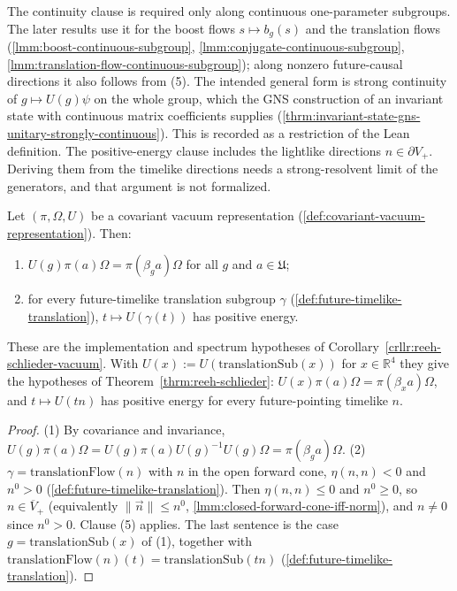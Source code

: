 \begin{definition}
    The continuity clause is required only along continuous one-parameter subgroups. The later results use it for the boost flows $s \mapsto b_g(s)$ and the translation flows (\ref{lmm:boost-continuous-subgroup}, \ref{lmm:conjugate-continuous-subgroup}, \ref{lmm:translation-flow-continuous-subgroup}); along nonzero future-causal directions it also follows from (5). The intended general form is strong continuity of $g \mapsto U(g)\psi$ on the whole group, which the GNS construction of an invariant state with continuous matrix coefficients supplies (\ref{thrm:invariant-state-gns-unitary-strongly-continuous}). This is recorded as a restriction of the Lean definition. The positive-energy clause includes the lightlike directions $n \in \partial V_+$. Deriving them from the timelike directions needs a strong-resolvent limit of the generators, and that argument is not formalized.
\end{definition}

\begin{lemma}
    \label{lmm:covariant-vacuum-bridge}
    \leanok
    Let $(\pi, \Omega, U)$ be a covariant vacuum representation (\ref{def:covariant-vacuum-representation}). Then:
    \begin{enumerate}
        \item $U(g)\pi(a)\Omega = \pi(\beta_g a)\Omega$ for all $g$ and $a \in \mathfrak{U}$;
        \item for every future-timelike translation subgroup $\gamma$ (\ref{def:future-timelike-translation}), $t \mapsto U(\gamma(t))$ has positive energy.
    \end{enumerate}
    These are the implementation and spectrum hypotheses of Corollary~\ref{crllr:reeh-schlieder-vacuum}. With $U(x) := U(\mathrm{translationSub}(x))$ for $x \in \mathbb{R}^4$ they give the hypotheses of Theorem~\ref{thrm:reeh-schlieder}: $U(x)\pi(a)\Omega = \pi(\beta_x a)\Omega$, and $t \mapsto U(tn)$ has positive energy for every future-pointing timelike $n$.
\end{lemma}
\begin{proof}
    \leanok
    (1) By covariance and invariance, $U(g)\pi(a)\Omega = U(g)\pi(a)U(g)^{-1}U(g)\Omega = \pi(\beta_g a)\Omega$. (2) $\gamma = \mathrm{translationFlow}(n)$ with $n$ in the open forward cone, $\eta(n,n) < 0$ and $n^0 > 0$ (\ref{def:future-timelike-translation}). Then $\eta(n,n) \le 0$ and $n^0 \ge 0$, so $n \in \overline{V}_+$ (equivalently $\|\vec n\| \le n^0$, \ref{lmm:closed-forward-cone-iff-norm}), and $n \neq 0$ since $n^0 > 0$. Clause (5) applies. The last sentence is the case $g = \mathrm{translationSub}(x)$ of (1), together with $\mathrm{translationFlow}(n)(t) = \mathrm{translationSub}(tn)$ (\ref{def:future-timelike-translation}).
\end{proof}

